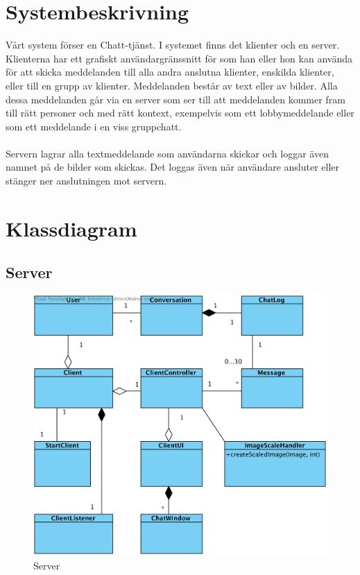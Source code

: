 \documentclass[a4paper,11pt]{article}
\begin{document}
\section{Systembeskrivning}

Vårt system förser en Chatt-tjänst. I systemet finns det klienter och en server. Klienterna har ett grafiskt användargränssnitt för som han eller hon kan använda för att skicka meddelanden till alla andra anslutna klienter, enskilda klienter, eller till en grupp av klienter. Meddelanden består av text eller av bilder. Alla dessa meddelanden går via en server som ser till att meddelanden kommer fram till rätt personer och med rätt kontext, exempelvis som ett lobbymeddelande eller som ett meddelande i en viss gruppchatt.
\\
\\
Servern lagrar alla textmeddelande som användarna skickar och loggar även namnet på de bilder som skickas. Det loggas även när användare ansluter eller stänger ner anslutningen mot servern.

\section{Klassdiagram}
\subsection{Server}
	\begin{figure}[H]
		\centering
		\includegraphics[width=\textwidth]{diagram/Client.png}
		\caption{Server}

	\end{figure}
\end{document}

